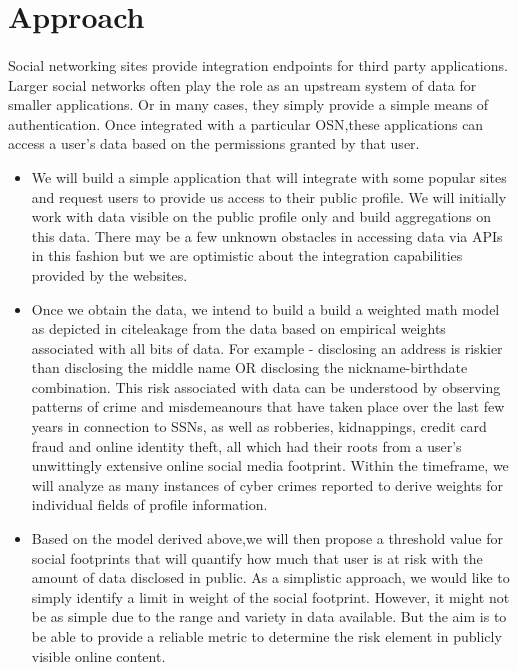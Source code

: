 \documentclass[11pt]{article}
\begin{document}
\section{Approach}
\paragraph{}
Social networking sites provide integration endpoints for third party applications. Larger social networks often play the role as an upstream system of data for smaller applications. Or in many cases, they simply provide a simple means of authentication. Once integrated with a particular OSN,these applications can access a user’s data based on the permissions granted by that user.
  \begin{itemize}
   \item We will build a simple application that will integrate with some popular sites and request users to provide us access to their public profile. We will initially work with data visible on the public profile only and build aggregations on this data. There may be a few unknown obstacles in accessing data via APIs in this fashion but we are optimistic about the integration capabilities provided by the websites.
   \item Once we obtain the data, we intend to build a build a weighted math model as depicted in cite{leakage} from the data based on empirical weights associated with all bits of data. For example - disclosing an address is riskier than disclosing the middle name OR disclosing the nickname-birthdate combination. This risk associated with data can be understood by observing patterns of crime and misdemeanours that have taken place over the last few years in connection to SSNs, as well as robberies, kidnappings, credit card fraud and online identity theft, all which had their roots from a user's unwittingly extensive online social media footprint. Within the timeframe, we will analyze as many instances of cyber crimes reported to derive weights for individual fields of profile information.
   \item Based on the model derived above,we will then propose a threshold value for social footprints that will quantify how much that user is at risk with the amount of data disclosed in public. As a simplistic approach, we would like to simply identify a limit in weight of the social footprint. However, it might not be as simple due to the range and variety in data available. But the aim is to be able to provide a reliable metric to determine the risk element in publicly visible online content.

\end{itemize}
\end{document}
